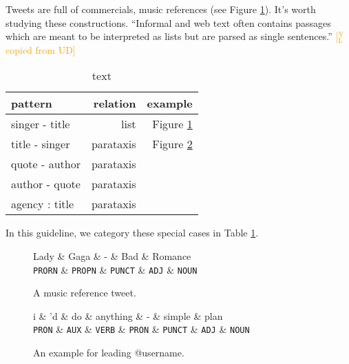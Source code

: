 \documentclass[11pt,a4paper]{article}
\newcommand{\yjcomment}[1]{\textcolor{orange}{[$_\mathrm{L}^\mathrm{Y}$#1]}}
\begin{document}
Tweets are full of commercials, music references (see Figure \ref{fig:singer-title}).
It's worth studying these constructions.
``Informal and web text often contains passages which are meant to be
interpreted as lists but are parsed as single sentences.'' \yjcomment{copied from UD}

\begin{table}[t]
	\centering
	\begin{tabular}{lrr}
		\hline
		pattern & relation & example \\
		\hline
		singer - title & list & Figure \ref{fig:singer-title} \\
		title - singer & parataxis & Figure \ref{fig:title-singer} \\
		quote - author & parataxis & \\
		author - quote & parataxis & \\
		agency : title & parataxis & \\
		\hline
	\end{tabular}
\caption{text}\label{tbl:list-construct}
\end{table}

In this guideline, we category these special cases in Table \ref{tbl:list-construct}.

\begin{figure}[t]
	\centering
	\small
	\begin{dependency}[edge slant=2, text only label, label style=above]
		\begin{deptext}
			Lady  \& Gaga \& - \& Bad \& Romance \\
			\texttt{PRORN} \& \texttt{PROPN} \& \texttt{PUNCT} \& \texttt{ADJ} \& \texttt{NOUN} \\
		\end{deptext}
	\end{dependency}
	\caption{A music reference tweet.}\label{fig:singer-title}
\end{figure}

\begin{figure}[t]
	\centering
	\small
	\begin{dependency}[edge slant=2, text only label, label style=above]
		\begin{deptext}
			i \& 'd \& do \& anything \& - \& simple \& plan \\
			\texttt{PRON} \& \texttt{AUX} \& \texttt{VERB} \& \texttt{PRON} \& \texttt{PUNCT} \& \texttt{ADJ} \& \texttt{NOUN} \\
		\end{deptext}
	\end{dependency}
	\caption{An example for leading @username.}\label{fig:title-singer}
\end{figure}
\end{document}

